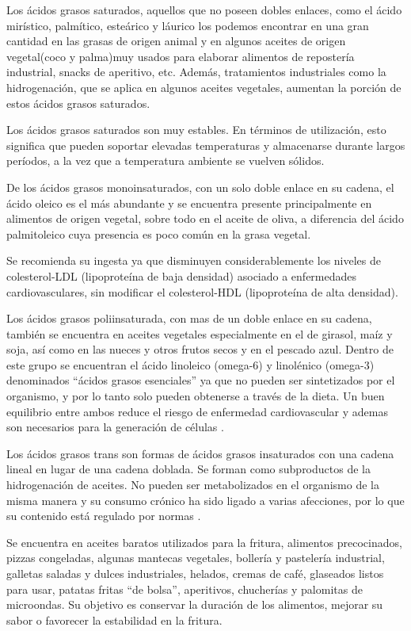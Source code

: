 \documentclass[a4paper,12pt]{article}
\begin{document}
\begin{multicols}{2}
Los ácidos grasos saturados, aquellos que no poseen dobles enlaces, como el ácido mirístico, palmítico, esteárico y láurico los podemos encontrar en una gran cantidad en las grasas de origen animal y en algunos aceites de origen vegetal(coco y palma)muy usados para elaborar alimentos de repostería industrial, snacks de aperitivo, etc. Además, tratamientos industriales como la hidrogenación, que se aplica en algunos aceites vegetales, aumentan la porción de estos ácidos grasos saturados.

Los ácidos grasos saturados son muy estables. En términos de utilización, esto significa que pueden soportar elevadas temperaturas y almacenarse durante largos períodos, a la vez que a temperatura ambiente se vuelven sólidos.

De los ácidos grasos monoinsaturados, con un solo doble enlace en su cadena, el ácido oleico es el más abundante y se encuentra presente principalmente en alimentos de origen vegetal, sobre todo en el aceite de oliva, a diferencia del ácido palmitoleico cuya presencia es poco común en la grasa vegetal.

Se recomienda su ingesta ya que disminuyen considerablemente los niveles de colesterol-LDL (lipoproteína de baja densidad) asociado a enfermedades cardiovasculares, sin modificar el colesterol-HDL (lipoproteína de alta densidad)\cite{Andarwulan2014,Orsavova2015}. 

Los ácidos grasos poliinsaturada, con mas de un doble enlace en su cadena, también se encuentra en aceites vegetales especialmente en el de girasol, maíz y soja, así como en las nueces y otros frutos secos y en el pescado azul. Dentro de este grupo se encuentran el ácido linoleico (omega-6) y linolénico (omega-3) denominados “ácidos grasos esenciales” ya que no pueden ser sintetizados por el organismo, y por lo tanto solo pueden obtenerse a través de la dieta. Un buen equilibrio entre ambos reduce el riesgo de enfermedad cardiovascular y ademas son necesarios para la generación de células \cite{NasiffHadad2003,AlfonsoValenzuela}.

Los ácidos grasos trans son formas de ácidos grasos insaturados con una cadena lineal en lugar de una cadena doblada. Se forman como subproductos de la hidrogenación de aceites. No pueden ser metabolizados en el organismo de la misma manera y su consumo crónico ha sido ligado a varias afecciones, por lo que su contenido está regulado por normas \cite{BarreraArellano1993}.

Se encuentra en aceites baratos utilizados para la fritura, alimentos precocinados, pizzas congeladas, algunas mantecas vegetales, bollería y pastelería industrial, galletas saladas y dulces industriales, helados, cremas de café, glaseados listos para usar, patatas fritas “de bolsa”, aperitivos, chucherías y palomitas de microondas. Su objetivo es conservar la duración de los alimentos, mejorar su sabor o favorecer la estabilidad en la fritura. 


\end{multicols}
\end{document}
